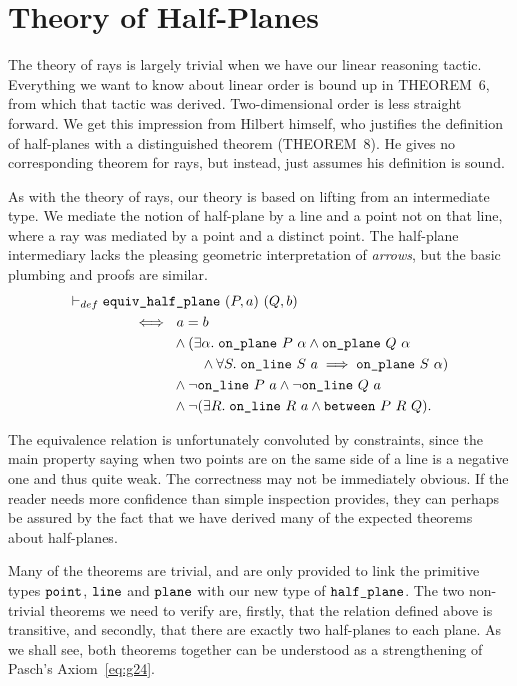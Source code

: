 \section{Theory of Half-Planes}\label{sec:HalfPlaneTheory}
The theory of rays is largely trivial when we have our linear reasoning tactic. Everything we want to know about linear order is bound up in THEOREM~6, from which that tactic was derived. Two-dimensional order is less straight forward. We get this impression from Hilbert himself, who justifies the definition of half-planes with a distinguished theorem (THEOREM~8). He gives no corresponding theorem for rays, but instead, just assumes his definition is sound.

As with the theory of rays, our theory is based on lifting from an intermediate type. We mediate the notion of half-plane by a line and a point not on that line, where a ray was mediated by a point and a distinct point. The half-plane intermediary lacks the pleasing geometric interpretation of \emph{arrows}, but the basic plumbing and proofs are similar.
\begin{equation}\label{eq:SameSidePlaneDef}
  \begin{split}
    \vdash_{def}\;& \code{equiv\_half\_plane}\ (P,a)\ (Q,b)\\
    & \qquad\iff\ a=b \\
    & \qquad\quad\qquad \wedge (\exists \alpha.\; \code{on\_plane}\ P\ \alpha \wedge \code{on\_plane}\ Q\ \alpha\\
    & \qquad\quad\qquad\qquad \wedge \forall S.\;\code{on\_line}\ S\ a \implies \code{on\_plane}\ S\ \alpha)\\
    & \qquad\quad\qquad \wedge \neg\code{on\_line}\ P\ a \wedge \neg\code{on\_line}\ Q\ a\\
    & \qquad\quad\qquad \wedge \neg(\exists R.\; \code{on\_line}\ R\ a \wedge \between{P}{R}{Q}).
  \end{split}
\end{equation}

The equivalence relation is unfortunately convoluted by constraints, since the main property saying when two points are on the same side of a line is a negative one and thus quite weak. The correctness may not be immediately obvious. If the reader needs more confidence than simple inspection provides, they can perhaps be assured by the fact that we have derived many of the expected theorems about half-planes. 

Many of the theorems are trivial, and are only provided to link the primitive types $\texttt{point}$, $\texttt{line}$ and $\texttt{plane}$ with our new type of $\texttt{half\_plane}$. The two non-trivial theorems we need to verify are, firstly, that the relation defined above is transitive, and secondly, that there are exactly two half-planes to each plane. As we shall see, both theorems together can be understood as a strengthening of Pasch's Axiom~\eqref{eq:g24}.

